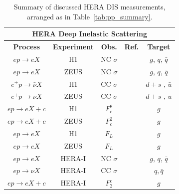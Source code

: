 \documentclass[12pt,oneside,openright]{report}
\begin{document}
\begin{spacing}{1.5}
\begin{table}
\begin{center}
\begin{tabular}{|c|c|c|c|c|}
\hline
\multicolumn{5}{|c|}{\textbf{HERA Deep Inelastic Scattering}}\\
\hline
\textbf{Process} & \textbf{Experiment} & \textbf{Obs.} &\textbf{Ref.} &  \textbf{Target} \\
\hline\hline
$e p \to e X$ & H1 & NC $\sigma$ & \cite{Adloff:2000qk,Adloff:2000qj,Adloff:2003uh} & $g$, $q$, $\bar{q}$\\
$e p \to e X$ & ZEUS & NC $\sigma$& \cite{Breitweg:1998dz,Chekanov:2001qu,Chekanov:2002ej,Chekanov:2003yv}& $g$, $q$, $\bar{q}$\\
\hline
$e^+ p \to \bar{\nu} X$ & H1 & CC $\sigma$& \cite{Chekanov:2003vw} & $d + s$ , $\bar{u}$ \\
$e^+ p \to \bar{\nu} X$ & ZEUS & CC $\sigma$ & \cite{Adloff:2003uh} & $d + s$ , $\bar{u}$ \\
\hline
$e p \to e X+c$ & H1 & $F^2_c$ & \cite{Chekanov:2003rb,Chekanov:2007ch,Aktas:2005iw,Aktas:2004az} & $g$\\
$e p \to e X+c$ & ZEUS & $F^2_c$ & \cite{Adloff:1996xq,Adloff:2001zj,Breitweg:1999ad} & $g$\\
\hline
$e p \to e X$ & H1 & $F_L$ & \cite{Andreev:2013vha} & $g$ \\
$e p \to e X$ & ZEUS & $F_L$ & \cite{Chekanov:2009na} & $g$\\
\hline\hline
$e p \to e X$ & HERA-I & NC $\sigma$&\cite{aaron:2009wt}& $g$, $q$, $\bar{q}$ \\
$e p \to \nu X$ & HERA-I & CC $\sigma$&\cite{aaron:2009wt}& $q, \bar{q}$\\
\hline
$e p \to e X+c$ & HERA-I & $F_2^c$ & \cite{Abramowicz:1900rp} & $g$\\
\hline
\end{tabular}
\end{center}
\label{tab:HERA_summary}
\caption{Summary of discussed HERA DIS measurements, arranged as in Table~\ref{tab:pp_summary}.}
\end{table}%


\end{spacing}
\end{document}
